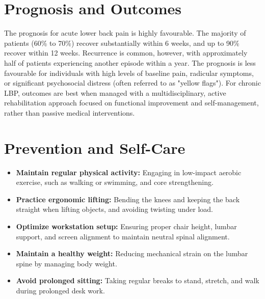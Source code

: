 \section*{Prognosis and Outcomes}
The prognosis for acute lower back pain is highly favourable. The majority of patients (60\% to 70\%) recover substantially within 6 weeks, and up to 90\% recover within 12 weeks. Recurrence is common, however, with approximately half of patients experiencing another episode within a year. The prognosis is less favourable for individuals with high levels of baseline pain, radicular symptoms, or significant psychosocial distress (often referred to as "yellow flags"). For chronic LBP, outcomes are best when managed with a multidisciplinary, active rehabilitation approach focused on functional improvement and self-management, rather than passive medical interventions.

\section*{Prevention and Self-Care}
\begin{itemize}
    \item \textbf{Maintain regular physical activity:} Engaging in low-impact aerobic exercise, such as walking or swimming, and core strengthening.
    \item \textbf{Practice ergonomic lifting:} Bending the knees and keeping the back straight when lifting objects, and avoiding twisting under load.
    \item \textbf{Optimize workstation setup:} Ensuring proper chair height, lumbar support, and screen alignment to maintain neutral spinal alignment.
    \item \textbf{Maintain a healthy weight:} Reducing mechanical strain on the lumbar spine by managing body weight.
    \item \textbf{Avoid prolonged sitting:} Taking regular breaks to stand, stretch, and walk during prolonged desk work.
\end{itemize}

